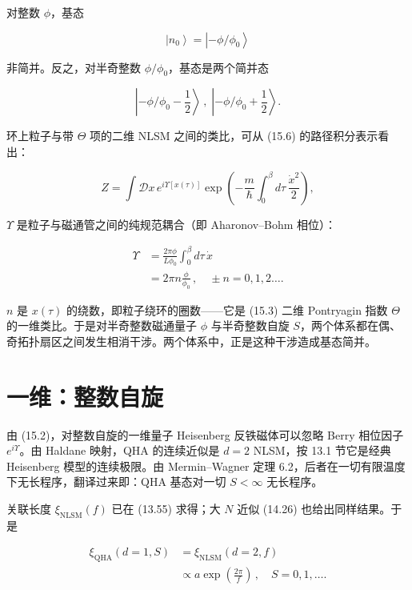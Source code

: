 对整数 $\phi$，基态

\begin{equation*}
\left| n _ {0} \right\rangle = \left| - \phi / \phi_ {0} \right\rangle
\tag{15.8}
\end{equation*}

非简并。反之，对半奇整数 $\phi/\phi_{0}$，基态是两个简并态

\begin{equation*}
\left| - \phi / \phi_ {0} - \frac {1}{2} \right\rangle \, , \; \left| - \phi / \phi_ {0} + \frac {1}{2} \right\rangle .
\tag{15.9}
\end{equation*}

环上粒子与带 $\Theta$ 项的二维 NLSM 之间的类比，可从 (15.6) 的路径积分表示看出：

\begin{equation*}
Z = \int \mathcal {D} x \, e ^ {i \Upsilon [ x ( \tau ) ]} \exp \left( - \frac {m}{\hbar} \int_ {0} ^ {\beta} d \tau \, \frac {\dot {x} ^ {2}}{2} \right) ,
\tag{15.10}
\end{equation*}

$\Upsilon$ 是粒子与磁通管之间的纯规范耦合（即 Aharonov--Bohm 相位）：

\begin{align*}
\Upsilon & = \frac {2 \pi \phi}{L \phi_ {0}} \int_ {0} ^ {\beta} d \tau \, \dot {x}\\
& = 2 \pi n \frac {\phi}{\phi_ {0}} \, , \quad \pm n = 0, 1, 2 \dots .
\tag{15.11}
\end{align*}

$n$ 是 $x(\tau)$ 的绕数，即粒子绕环的圈数——它是 (15.3) 二维 Pontryagin 指数 $\Theta$ 的一维类比。于是对半奇整数磁通量子 $\phi$ 与半奇整数自旋 $S$，两个体系都在偶、奇拓扑扇区之间发生相消干涉。两个体系中，正是这种干涉造成基态简并。

\section{一维：整数自旋}

由 (15.2)，对整数自旋的一维量子 Heisenberg 反铁磁体可以忽略 Berry 相位因子 $e^{i\Upsilon}$。由 Haldane 映射，QHA 的连续近似是 $d=2$ NLSM，按 13.1 节它是经典 Heisenberg 模型的连续极限。由 Mermin--Wagner 定理 6.2，后者在一切有限温度下无长程序，翻译过来即：QHA 基态对一切 $S < \infty$ 无长程序。

关联长度 $\xi_{\mathrm{NLSM}}(f)$ 已在 (13.55) 求得；大 $N$ 近似 (14.26) 也给出同样结果。于是

\begin{align*}
\xi_{\mathrm{QHA}} ( d = 1, S ) & = \xi_{\mathrm{NLSM}} ( d = 2, f )\\
& \propto a \exp \left( \frac {2 \pi}{f} \right) \, , \quad S = 0, 1, \ldots .
\tag{15.12}
\end{align*}

